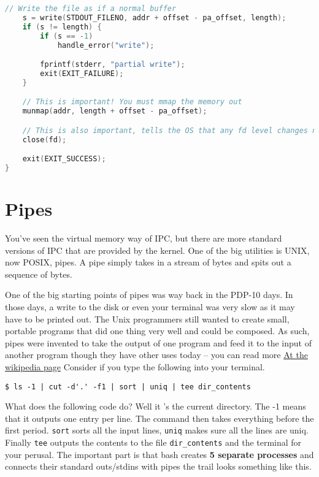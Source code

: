 \begin{lstlisting}[language=C]
    // Write the file as if a normal buffer
    s = write(STDOUT_FILENO, addr + offset - pa_offset, length);
    if (s != length) {
        if (s == -1)
            handle_error("write");

        fprintf(stderr, "partial write");
        exit(EXIT_FAILURE);
    }

    // This is important! You must mmap the memory out
    munmap(addr, length + offset - pa_offset);

    // This is also important, tells the OS that any fd level changes need to be addressed
    close(fd);

    exit(EXIT_SUCCESS);
}
\end{lstlisting}


\section{Pipes}

You've seen the virtual memory way of IPC, but there are more standard versions of IPC that are provided by the kernel.
One of the big utilities is UNIX, now POSIX, pipes. A pipe simply takes in a stream of bytes and spits out a sequence of bytes.

One of the big starting points of pipes was way back in the PDP-10 days. In those days, a write to the disk or even your terminal was very slow as it may have to be printed out.
The Unix programmers still wanted to create small, portable programs that did one thing very well and could be composed.
As such, pipes were invented to take the output of one program
and feed it to the input of another program though they have other uses today -- you can read more \href{https://en.wikipedia.org/wiki/Pipeline\_\%28Unix\%29}{At the wikipedia page}
Consider if you type the following into your terminal.

\begin{verbatim}
$ ls -1 | cut -d'.' -f1 | sort | uniq | tee dir_contents
\end{verbatim}

What does the following code do? Well it 's the current directory.
The -1 means that it outputs one entry per line.
The  command then takes everything before the first period.
\texttt{sort} sorts all the input lines, \texttt{uniq} makes sure all the lines are uniq.
Finally \texttt{tee} outputs the contents to the file \texttt{dir\_contents} and the terminal for your perusal.
The important part is that bash creates \textbf{5 separate processes} and connects their standard outs/stdins with pipes the trail looks something like this.

